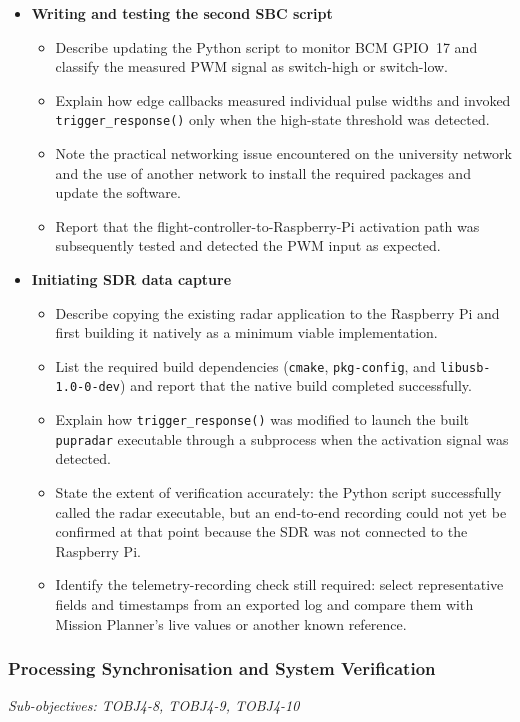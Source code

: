 \begin{itemize}
    \item \textbf{Writing and testing the second SBC script}
    \begin{itemize}
        \item Describe updating the Python script to monitor BCM GPIO~17 and classify the measured PWM signal as switch-high or switch-low.
        \item Explain how edge callbacks measured individual pulse widths and invoked \texttt{trigger\_response()} only when the high-state threshold was detected.
        \item Note the practical networking issue encountered on the university network and the use of another network to install the required packages and update the software.
        \item Report that the flight-controller-to-Raspberry-Pi activation path was subsequently tested and detected the PWM input as expected.
    \end{itemize}

    \item \textbf{Initiating SDR data capture}
    \begin{itemize}
        \item Describe copying the existing radar application to the Raspberry Pi and first building it natively as a minimum viable implementation.
        \item List the required build dependencies (\texttt{cmake}, \texttt{pkg-config}, and \texttt{libusb-1.0-0-dev}) and report that the native build completed successfully.
        \item Explain how \texttt{trigger\_response()} was modified to launch the built \texttt{pupradar} executable through a subprocess when the activation signal was detected.
        \item State the extent of verification accurately: the Python script successfully called the radar executable, but an end-to-end recording could not yet be confirmed at that point because the SDR was not connected to the Raspberry Pi.
        \item Identify the telemetry-recording check still required: select representative fields and timestamps from an exported log and compare them with Mission Planner's live values or another known reference.
    \end{itemize}
\end{itemize}

\subsubsection{Processing Synchronisation and System Verification}
\textit{Sub-objectives: TOBJ4-8, TOBJ4-9, TOBJ4-10}

